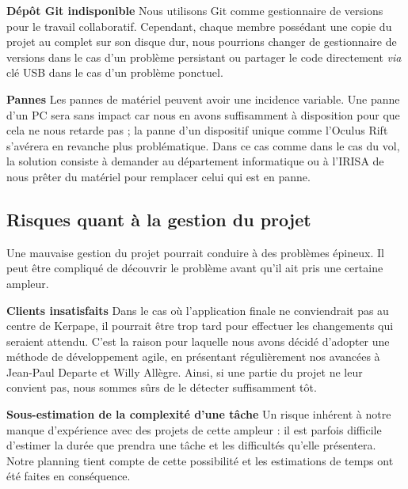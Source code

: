\textbf{Dépôt Git indisponible}
\newline
Nous utilisons Git comme gestionnaire de versions pour le travail collaboratif. Cependant, chaque membre possédant une copie du projet au complet sur son disque dur, nous pourrions changer de gestionnaire de versions dans le cas d'un problème persistant ou partager le code directement \emph{via} clé USB dans le cas d'un problème ponctuel.\newline

\textbf{Pannes}
\newline
Les pannes de matériel peuvent avoir une incidence variable. Une panne d'un PC sera sans impact car nous en avons suffisamment à disposition pour que cela ne nous retarde pas ; la panne d'un dispositif unique comme l'Oculus Rift s'avérera en revanche plus problématique.\newline
Dans ce cas comme dans le cas du vol, la solution consiste à demander au département informatique ou à l'IRISA de nous prêter du matériel pour remplacer celui qui est en panne.\newline

\subsection{Risques quant à la gestion du projet}
Une mauvaise gestion du projet pourrait conduire à des problèmes épineux. Il peut être compliqué de découvrir le problème avant qu'il ait pris une certaine ampleur. \newline

\textbf{Clients insatisfaits}
\newline
Dans le cas où l'application finale ne conviendrait pas au centre de Kerpape, il pourrait être trop tard pour effectuer les changements qui seraient attendu. C'est la raison pour laquelle nous avons décidé d'adopter une méthode de développement agile, en présentant régulièrement nos avancées à Jean-Paul Departe et Willy Allègre. Ainsi, si une partie du projet ne leur convient pas, nous sommes sûrs de le détecter suffisamment tôt. \newline

\textbf{Sous-estimation de la complexité d'une tâche}
\newline
Un risque inhérent à notre manque d'expérience avec des projets de cette ampleur : il est parfois difficile d'estimer la durée que prendra une tâche et les difficultés qu'elle présentera. Notre planning tient compte de cette possibilité et les estimations de temps ont été faites en conséquence.\newline
